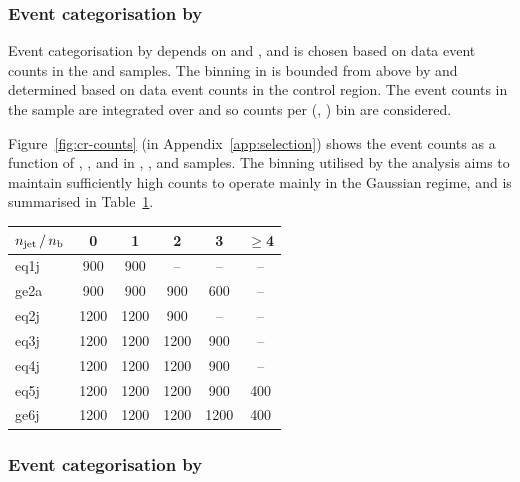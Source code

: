 \subsubsection{Event categorisation by  \texorpdfstring{\nb}{Nb}}
\label{sec:nb-categorisation}

Event categorisation by \nb depends on \njet and \scalht, and is
chosen based on data event counts in the \mj and \mmj samples. The
binning in \nb is bounded from above by \njet and determined based on
data event counts in the \mj control region. The event counts in the
\mmj sample are integrated over \nb and so counts per (\njet, \scalht)
bin are considered.

Figure~\ref{fig:cr-counts} (in Appendix~\ref{app:selection}) shows the
event counts as a function of \njet, \nb, and \scalht in \mj, \mmj,
and \gj samples. The binning utilised by the analysis aims to maintain
sufficiently high counts to operate mainly in the Gaussian regime, and
is summarised in Table~\ref{tab:sr-binning}.

\begin{table}[!h]
  \label{tab:sr-binning}
  \centering
  \begin{tabular}{ lccccc }
    \hline
    $n_{\text{jet}}\, / \,n_{\text{b}}$ & 0    & 1    & 2    & 3    & $\geq$4 \\
    \hline
    eq1j              & 900  & 900  & --   & --   & --      \\ 
    ge2a              & 900  & 900  & 900  & 600  & --      \\ 
    eq2j              & 1200 & 1200 & 900  & --   & --      \\ 
    eq3j              & 1200 & 1200 & 1200 & 900  & --      \\ 
    eq4j              & 1200 & 1200 & 1200 & 900  & --      \\ 
    eq5j              & 1200 & 1200 & 1200 & 900  & 400     \\ 
    ge6j              & 1200 & 1200 & 1200 & 1200 & 400     \\ 
    \hline
  \end{tabular}
\end{table}

\subsubsection{Event categorisation by \texorpdfstring{\HTmiss}{HTmiss}}
\label{sec:htmiss-categorisation}

